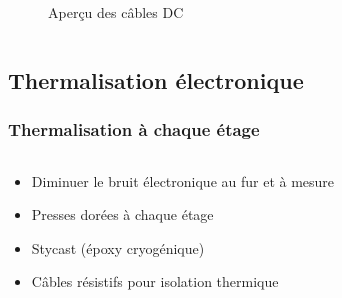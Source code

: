 \documentclass[8pt,a9paper]{beamer} \usepackage[utf8]{inputenc} \usepackage[francais]{babel} \usepackage[T1]{fontenc}
\begin{document}
\begin{frame}
\begin{columns}
\begin{column}{0.3\textwidth}
\begin{figure}[h]
\begin{center}
        \caption{Aperçu des câbles DC}
    \end{center}
\end{figure}
\end{column}
\end{columns}

\end{frame}
\subsection{Thermalisation électronique}
\begin{frame}
\frametitle{Thermalisation à chaque étage}

\begin{columns}
\begin{column}{0.6\textwidth}
    \begin{itemize}
        \item Diminuer le bruit électronique au fur et à mesure
        \vspace*{5mm}
        \item Presses dorées à chaque étage
        \item Stycast (époxy cryogénique)
        \vspace*{5mm}
        \item Câbles résistifs pour isolation thermique
    \end{itemize}
\end{column}
\begin{column}{0.3\textwidth}
\begin{figure}
    \begin{center}

\end{center}
\end{figure}
\end{column}
\end{columns}
\end{frame}
\end{document}
